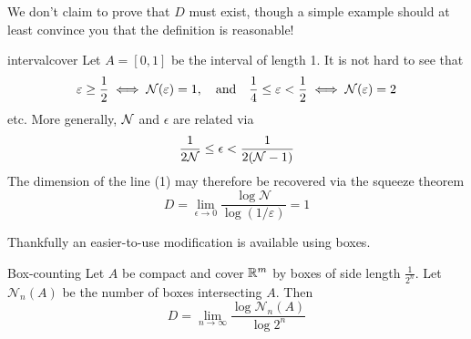 We don't claim to prove that $D$ must exist, though a simple example should at least convince you that the definition is reasonable!

\begin{example}{}{intervalcover}
Let $A=[0,1]$ be the interval of length 1. It is not hard to see that
\[\varepsilon\ge\frac 12\iff \mathcal{N}(\varepsilon)=1,\quad\text{and}\quad \frac 14\le \varepsilon<\frac 12\iff \mathcal{N}(\varepsilon)=2\]
etc. More generally, $\mathcal{N}$ and $\epsilon$ are related via
\[\frac 1{2\mathcal{N}}\le\epsilon<\frac 1{2(\mathcal{N}-1)}\]
The dimension of the line (1) may therefore be recovered via the squeeze theorem
\[%
D=\lim_{\epsilon\to 0}\frac{\log\mathcal N}{\log (1/\varepsilon)}=1\]
\end{example}



Thankfully an easier-to-use modification is available using boxes.

\begin{thm}[breakable]{Box-counting}{}
Let $A$ be compact and cover $\mathbb{R}^m$ by boxes of side length $\frac 1{2^n}$. Let $\mathcal N_n(A)$ be the number of boxes intersecting $A$. Then
\[D=\lim_{n\to\infty}\frac{\log\mathcal N_n(A)}{\log 2^n}\]
\end{thm}

